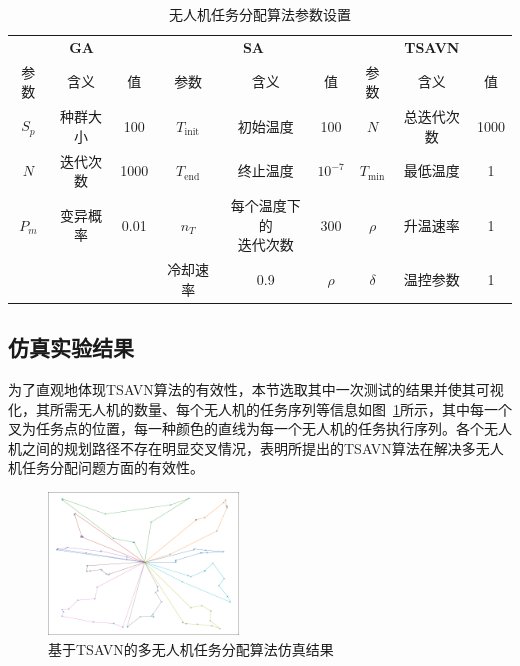 \begin{table}[!htbp]
    \caption{无人机任务分配算法参数设置}
    \label{tab:无人机任务分配算法参数设置}
    \centering
    \begin{tabular}{c c c c c c c c c}
        \toprule
        \multicolumn{3}{c}{\textbf{GA}} & \multicolumn{3}{c}{\textbf{SA}} & \multicolumn{3}{c}{\textbf{TSAVN}} \\
        \cmidrule(lr){1-3} \cmidrule(lr){4-6} \cmidrule(lr){7-9}
        参数 & 含义 & 值 & 参数 & 含义 & 值 & 参数 & 含义 & 值 \\
        \midrule
        \( S_p \) & 种群大小 & 100 & \( T_{\textrm{init}} \) & 初始温度 & 100 & \( N \) & 总迭代次数 & 1000\\
        \( N \) & 迭代次数 & 1000 & \( T_{\textrm{end}} \) & 终止温度 & \(10^{-7}\) & \( T_{\textrm{min}} \) & 最低温度 & 1\\
        \( P_m \) & 变异概率 & 0.01 & \( n_T \) & \makecell[c]{每个温度下的 \\ 迭代次数} & 300 &\( \rho \) & 升温速率 & 1\\
        & & & 冷却速率 & 0.9 & \( \rho \)  & \( \delta \) & 温控参数 & 1 \\
        \bottomrule
    \end{tabular}
\end{table}

\subsection{仿真实验结果}

为了直观地体现TSAVN算法的有效性，本节选取其中一次测试的结果并使其可视化，其所需无人机的数量、每个无人机的任务序列等信息如图~\ref{fig:基于TSAVN的多无人机算法仿真结果}所示，其中每一个叉为任务点的位置，每一种颜色的直线为每一个无人机的任务执行序列。各个无人机之间的规划路径不存在明显交叉情况，表明所提出的TSAVN算法在解决多无人机任务分配问题方面的有效性。

\begin{figure}[!htbp]
    \centering
    \includegraphics[width=0.45\textwidth]{images/TSAVN算法结果可视化.pdf}
    \caption{基于TSAVN的多无人机任务分配算法仿真结果}
    \label{fig:基于TSAVN的多无人机算法仿真结果}
\end{figure}

